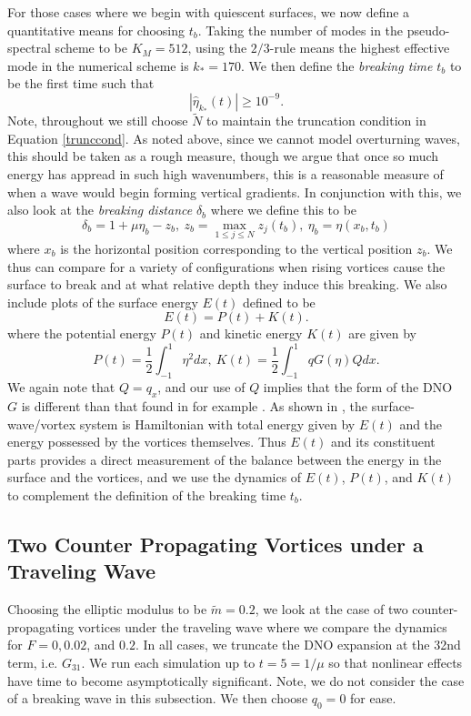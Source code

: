 \documentclass[a4paper,11pt]{article}
\begin{document}
For those cases where we begin with quiescent surfaces, we now define a quantitative means for choosing $t_{b}$. Taking the number of modes in the pseudo-spectral scheme to be $K_{M}=512$, using the $2/3$-rule means the highest effective mode in the numerical scheme is $k_{\ast}=170$.  We then define the {\it breaking time} $t_{b}$ to be the first time such that
\[
\left|\hat{\eta}_{k_{\ast}}(t)\right| \geq 10^{-9}.  
\]
Note, throughout we still choose $\tilde{N}$ to maintain the truncation condition in Equation \eqref{trunccond}.  As noted above, since we cannot model overturning waves, this should be taken as a rough measure, though we argue that once so much energy has appread in such high wavenumbers, this is a reasonable measure of when a wave would begin forming vertical gradients.  In conjunction with this, we also look at the {\it breaking distance} $\delta_{b}$ where we define this to be 
\[
\delta_{b} = 1 + \mu\eta_{b} - z_{b}, ~ z_{b} = \max_{1\leq j \leq N} z_{j}(t_{b}), ~ \eta_{b} = \eta(x_{b},t_{b})
\]
where $x_{b}$ is the horizontal position corresponding to the vertical position $z_{b}$.  We thus can compare for a variety of configurations when rising vortices cause the surface to break and at what relative depth they induce this breaking.  We also include plots of the surface energy $E(t)$ defined to be 
\[
E(t) = P(t) + K(t).
\] 
where the potential energy $P(t)$ and kinetic energy $K(t)$ are given by 
\[
P(t) =  \frac{1}{2}\int_{-1}^{1}\eta^{2}dx, ~ K(t) = \frac{1}{2}\int_{-1}^{1} q G(\eta)Q dx.
\]
We again note that $Q = q_{x}$, and our use of $Q$ implies that the form of the DNO $G$ is different than that found in for example \cite{craig}.  As shown in \cite{rouhi}, the surface-wave/vortex system is Hamiltonian with total energy given by $E(t)$ and the energy possessed by the vortices themselves.  Thus $E(t)$ and its constituent parts provides a direct measurement of the balance between the energy in the surface and the vortices, and we use the dynamics of $E(t)$, $P(t)$, and $K(t)$ to complement the definition of the breaking time $t_{b}$.   

\subsection{Two Counter Propagating Vortices under a Traveling Wave}

Choosing the elliptic modulus to be $\tilde{m}=0.2$, we look at the case of two counter-propagating vortices under the traveling wave where we compare the dynamics for $F=0, 0.02$, and $0.2$.  In all cases, we truncate the DNO expansion at the 32nd term, i.e. $G_{31}$.  We run each simulation up to $t=5=1/\mu$ so that nonlinear effects have time to become asymptotically significant.  Note, we do not consider the case of a breaking wave in this subsection.  We then choose $q_{0}=0$ for ease.        
\end{document}
